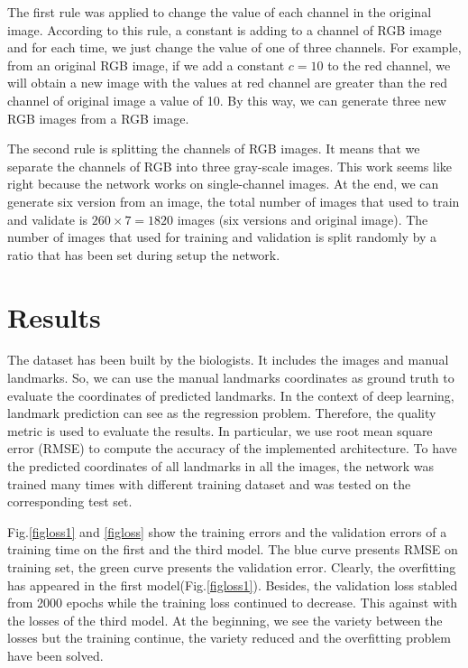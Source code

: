 \documentclass[conference]{IEEEtran}
\begin{document}
The first rule was applied to change the value of each channel in the original image. According to this rule, a constant is adding to a channel of RGB image and for each time, we just change the value of one of three channels. For example, from an original RGB image, if we add a constant $c = 10$ to the red channel, we will obtain a new image with the values at red channel are greater than the red channel of original image a value of 10. By this way, we can generate three new RGB images from a RGB image.

The second rule is splitting the channels of RGB images. It means that we separate the channels of RGB into three gray-scale images. This work seems like right because the network works on single-channel images. At the end, we can generate six version from an image, the total number of images that used to train and validate is $260 \times 7 = 1820$ images (six versions and original image). The number of images that used for training and validation is split randomly by a ratio that has been set during setup the network.

\section{Results}
The dataset has been built by the biologists. It includes the images and manual landmarks. So, we can use the manual landmarks coordinates as ground truth to evaluate the coordinates of predicted landmarks. In the context of deep learning, landmark prediction can see as the regression problem. Therefore, the quality metric is used to evaluate the results. In particular, we use root mean square error (RMSE) to compute the accuracy of the implemented architecture. To have the predicted coordinates of all landmarks in all the images, the network was trained many times with different training dataset and was tested on the corresponding test set.

Fig.\ref{figloss1} and \ref{figloss} show the training errors and the validation errors of a training time on the first and the third model. The blue curve presents RMSE on training set, the green curve presents the validation error. Clearly, the overfitting has appeared in the first model(Fig.\ref{figloss1}). Besides, the validation loss stabled from 2000 epochs while the training loss continued to decrease. This against with the losses of the third model. At the beginning, we see the variety between the losses but the training continue, the variety reduced and the overfitting problem have been solved.
\end{document}
